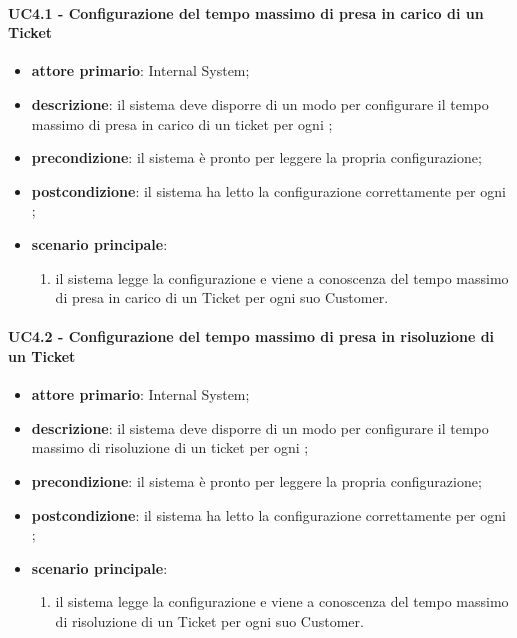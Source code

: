 \paragraph{UC4.1 - Configurazione del tempo massimo di presa in carico di un Ticket}
\begin{itemize}
	\item \textbf{attore primario}: Internal System;
	\item \textbf{descrizione}: il sistema deve disporre di un modo per configurare il tempo massimo di presa in carico di un ticket per ogni ; 
	\item \textbf{precondizione}: il sistema è pronto per leggere la propria configurazione;
	\item \textbf{postcondizione}: il sistema ha letto la configurazione correttamente per ogni ; 
	\item \textbf{scenario principale}: 
	\begin{enumerate}
		\item il sistema legge la configurazione e viene a conoscenza del tempo massimo di presa in carico di un Ticket per ogni suo Customer.
	\end{enumerate}
\end{itemize}
\paragraph{UC4.2 - Configurazione del tempo massimo di presa in risoluzione di un Ticket}
\begin{itemize}
	\item \textbf{attore primario}: Internal System;
	\item \textbf{descrizione}: il sistema deve disporre di un modo per configurare il tempo massimo di risoluzione di un ticket per ogni ; 
	\item \textbf{precondizione}: il sistema è pronto per leggere la propria configurazione;
	\item \textbf{postcondizione}: il sistema ha letto la configurazione correttamente per ogni ; 
	\item \textbf{scenario principale}: 
	\begin{enumerate}
		\item il sistema legge la configurazione e viene a conoscenza del tempo massimo di risoluzione di un Ticket per ogni suo Customer.
	\end{enumerate}
\end{itemize}
